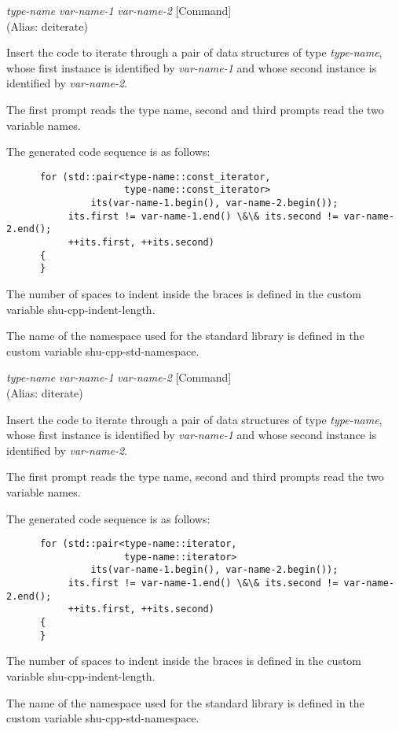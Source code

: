\vspace{1em}
\noindent
{}
\usebox{\funcname}\emph{type-name} \emph{var-name-1} \emph{var-name-2}
 \hfill [Command]\\%
 (Alias: dciterate)

\begin{doc-string}
Insert the code to iterate through a pair of data structures of type
\emph{type-name}, whose first instance is identified by \emph{var-name-1} and whose second
instance is identified by \emph{var-name-2}.

The first prompt reads the type name, second and third prompts read the two
variable names.

The generated code sequence is as follows:

\small{\begin{verbatim}
      for (std::pair<type-name::const_iterator,
                     type-name::const_iterator>
               its(var-name-1.begin(), var-name-2.begin());
           its.first != var-name-1.end() \&\& its.second != var-name-2.end();
           ++its.first, ++its.second)
      {
      }
\end{verbatim}}

The number of spaces to indent inside the braces is defined in the custom
variable shu-cpp-indent-length.

The name of the namespace used for the standard library is defined in the custom
variable shu-cpp-std-namespace.
\end{doc-string}

\vspace{1em}
\noindent
{}
\usebox{\funcname}\emph{type-name} \emph{var-name-1} \emph{var-name-2}
 \hfill [Command]\\%
 (Alias: diterate)

\begin{doc-string}
Insert the code to iterate through a pair of data structures of type
\emph{type-name}, whose first instance is identified by \emph{var-name-1} and whose second
instance is identified by \emph{var-name-2}.

The first prompt reads the type name, second and third prompts read the two
variable names.

The generated code sequence is as follows:

\small{\begin{verbatim}
      for (std::pair<type-name::iterator,
                     type-name::iterator>
               its(var-name-1.begin(), var-name-2.begin());
           its.first != var-name-1.end() \&\& its.second != var-name-2.end();
           ++its.first, ++its.second)
      {
      }
\end{verbatim}}

The number of spaces to indent inside the braces is defined in the custom
variable shu-cpp-indent-length.

The name of the namespace used for the standard library is defined in the custom
variable shu-cpp-std-namespace.
\end{doc-string}

